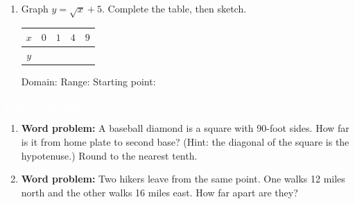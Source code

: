 \documentclass[11pt]{article}
\newcommand{\dayhdr}[3]{%
  \newpage
  \noindent\colorbox{#2}{\parbox{\linewidth}{%
    \vspace{6pt}\hspace{8pt}
    {\LARGE\textbf{\textcolor{white}{#1}}}
    \hfill
    {\normalsize\textcolor{white}{#3}}
    \vspace{6pt}
  }}
  \vspace{4pt}
}
\newcommand{\sechdr}[2]{%
  \vspace{8pt}
  \noindent\colorbox{#2}{\parbox{\linewidth}{%
    \vspace{3pt}\hspace{6pt}{\normalsize\textbf{\textcolor{white}{#1}}}\vspace{3pt}
  }}
  \vspace{4pt}
}
\newcommand{\wsl}{\vspace{3cm}}    %
\begin{document}
\begin{enumerate}[label=\textbf{\arabic*.}, start=10, itemsep=0pt]

  \item Graph $y = \sqrt{x} + 5$. \; Complete the table, then sketch.

  \medskip
  \begin{center}
  \renewcommand{\arraystretch}{2}
  \begin{tabular}{|c|c|c|c|c|}
  \hline
  $x$ & $0$ & $1$ & $4$ & $9$ \\
  \hline
  $y$ & & & & \\
  \hline
  \end{tabular}
  \end{center}

  \medskip
  \begin{center}
  \end{center}

  \noindent Domain: \underline{\hspace{3.5cm}} \quad Range: \underline{\hspace{3.5cm}} \quad Starting point: \underline{\hspace{2cm}}

\end{enumerate}

\dayhdr{Day 5 \quad Challenge}{day5}{10 problems · Hard}

\sechdr{Section A: Find the Missing Side Length}{day5}

\begin{enumerate}[label=\textbf{\arabic*.}, itemsep=0pt]

  \item \textbf{Word problem:} A baseball diamond is a square with 90-foot sides. How far is it from home plate to second base? (Hint: the diagonal of the square is the hypotenuse.) Round to the nearest tenth.
  \wsl

  \item \textbf{Word problem:} Two hikers leave from the same point. One walks 12 miles north and the other walks 16 miles east. How far apart are they?
  \wsl

\end{enumerate}
\end{document}

